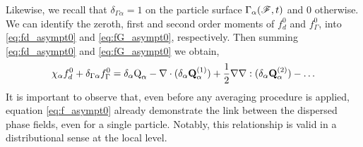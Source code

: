 Likewise, we recall that $\delta_{\Gamma\alpha} = 1$ on the particle surface $\Gamma_\alpha(\mathscr{F}, t)$ and $0$ otherwise.
We can identify the zeroth, first and second order moments of $f_d^0$ and $f_\Gamma^0$, into \ref{eq:fd_asympt0} and \ref{eq:fG_asympt0}, respectively. 
Then summing \ref{eq:fd_asympt0} and \ref{eq:fG_asympt0} we obtain,
\begin{equation}
    \chi_\alpha f^0_d  + \delta_{\Gamma\alpha} f_\Gamma^0  = \delta_\alpha\text Q_\alpha
    - \div  
    (\delta_\alpha\textbf{Q}_\alpha^{(1)})        
    + \frac{1}{2} \grad\grad : (\delta_\alpha\textbf{Q}_{\alpha}^{(2)})
    - \ldots  
    \label{eq:f_asympt0}
\end{equation}
It is important to observe that, even before any averaging procedure is applied, equation \ref{eq:f_asympt0} already demonstrate the link between the dispersed phase fields, even for a single particle. 
Notably, this relationship is valid in a distributional sense at the local level.%

